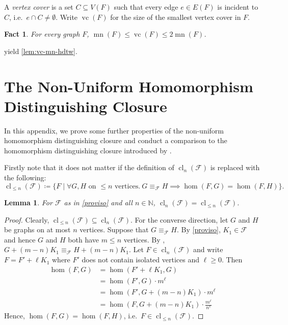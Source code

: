 \documentclass[10pt,a4paper]{article}
\theoremstyle{definition}
\theoremstyle{plain}
\newtheorem{lemma}[definition]{Lemma}
\newtheorem{fact}[definition]{Fact}
\theoremstyle{remark}
\DeclareMathOperator{\mn}{mn}
\DeclareMathOperator{\vc}{vc}
\DeclareMathOperator{\cl}{cl}
\begin{document}
	
	A \emph{vertex cover} is a set $C \subseteq V(F)$ such that every edge $e \in E(F)$ is incident to $C$, i.e.\ $e \cap C \neq \emptyset$.
	Write $\vc(F)$ for the size of the smallest vertex cover in $F$.
	
	\begin{fact} \label{fact:mn-vc}
		For every graph $F$, $\mn(F) \leq \vc(F) \leq 2\mn(F)$.
	\end{fact}
	
	 yield \cref{lem:vc-mn-hdtw}.
	
	\section{The Non-Uniform Homomorphism Distinguishing Closure}
	\label{app:cl}
	
	In this appendix, we prove some further properties of the non-uniform homomorphism distinguishing closure and conduct a comparison to the homomorphism distinguishing closure introduced by \textcite{roberson_oddomorphisms_2022}.
	
	Firstly note that it does not matter if the definition of $\cl_n(\mathcal{F})$ is replaced with the following:
	\[
	\cl_{\leq n}(\mathcal{F}) \coloneqq \{F \mid \forall G, H \text{ on $\leq n$ vertices}.\ G \equiv_{\mathcal{F}} H \implies \hom(F, G) = \hom(F, H)\}.
	\]
	
	\begin{lemma}\label{lem:cl-leq}
		For $\mathcal{F}$ as in \cref{proviso} and all $n \in \mathbb{N}$,
		$\cl_n(\mathcal{F}) = \cl_{\leq n}(\mathcal{F})$.
	\end{lemma}
	\begin{proof}
		Clearly,
		$\cl_{\leq n}(\mathcal{F}) \subseteq \cl_n(\mathcal{F})$.
		For the converse direction,
		let $G$ and $H$ be graphs on at most $n$ vertices.
		Suppose that $G \equiv_{\mathcal{F}} H$.
		By \cref{proviso}, $K_1 \in \mathcal{F}$ and hence $G$ and $H$ both have $m \leq n$ vertices.
		By \cite[Theorem~7]{seppelt_logical_2024},
		$G + (m-n)K_1 \equiv_{\mathcal{F}} H + (m-n) K_1$.
		Let $F \in \cl_n(\mathcal{F})$
		and write $F = F' + \ell K_1$ where $F'$ does not contain isolated vertices and $\ell \geq 0$.
		Then
		\begin{align*}
			\hom(F, G) 
			&= \hom(F' + \ell K_1, G)\\
			&= \hom(F', G) \cdot m^\ell \\
			&= \hom(F', G + (m-n)K_1) \cdot m^\ell \\
			&= \hom(F, G + (m-n)K_1) \cdot \frac{m^\ell}{n^\ell}
 		\end{align*}
 		Hence, $\hom(F, G) = \hom(F, H)$, i.e.\
 		$F \in \cl_{\leq n}(\mathcal{F})$.
	\end{proof}
	
\end{document}
